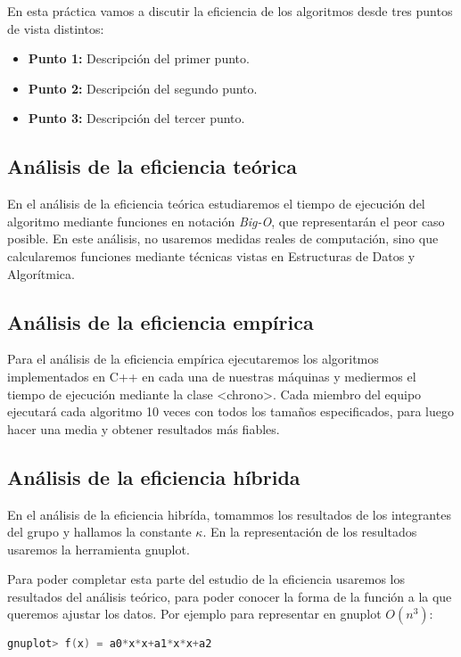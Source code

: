 \documentclass[a4paper,12pt]{article} %
\begin{document}
En esta práctica vamos a discutir la eficiencia de los algoritmos
desde tres puntos de vista distintos:

\begin{itemize}
	\item \textbf{Punto 1:} Descripción del primer punto.
	\item \textbf{Punto 2:} Descripción del segundo punto.
	\item \textbf{Punto 3:} Descripción del tercer punto.
\end{itemize}

\subsection{Análisis de la eficiencia teórica}
En el análisis de la eficiencia teórica estudiaremos el tiempo de ejecución del algoritmo
mediante funciones en notación \textit{Big-O}, que representarán el peor caso posible.
En este análisis, no usaremos medidas reales de computación, sino que calcularemos funciones
mediante técnicas vistas en Estructuras de Datos y Algorítmica.
\subsection{Análisis de la eficiencia empírica}
Para el análisis de la eficiencia empírica ejecutaremos los algoritmos implementados en C++ en cada
una de nuestras máquinas y mediermos el tiempo de ejecución mediante la
clase <chrono>. Cada miembro del equipo ejecutará cada algoritmo 10 veces con todos los tamaños especificados,
para luego hacer una media y obtener resultados más fiables.
\subsection{Análisis de la eficiencia híbrida}
En el análisis de la eficiencia hibrída, tomammos los resultados de los integrantes del grupo y hallamos
la constante $\kappa$. En la representación de los resultados usaremos la herramienta gnuplot.

Para poder completar esta parte del estudio de la eficiencia usaremos los resultados del análisis teórico, para
poder conocer la forma de la función a la que queremos ajustar los datos. Por ejemplo para representar en gnuplot $O(n^{3})$:

\begin{lstlisting}[language=C, caption={Ejemplo de $O(n^{2})$}]
       gnuplot> f(x) = a0*x*x+a1*x*x+a2
        \end{lstlisting}
\end{document}
